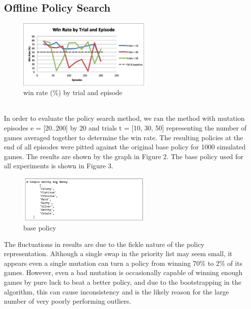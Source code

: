 \documentclass{article}
\begin{document}
\subsection{Offline Policy Search}
\begin{figure}[h]
  \includegraphics[width=250]{search.png}
  \caption{win rate (\%) by trial and episode}
\end{figure}
\\
In order to evaluate the policy search method, we ran the method with mutation episodes e = [20..200] by 20 and trials t = [10, 30, 50] representing the number of games averaged together to determine the win rate. The resulting policies at the end of all episodes were pitted against the original base policy for 1000 simulated games. The results are shown by the graph in Figure 2. The base policy used for all experiments is shown in Figure 3.
\begin{figure}[h]
  \includegraphics[width=250]{policy.png}
  \caption{base policy}
\end{figure}
The fluctuations in results are due to the fickle nature of the policy representation. Although a single swap in the priority list may seem small, it appears even a single mutation can turn a policy from winning 70\% to 2\% of its games. However, even a bad mutation is occasionally capable of winning enough games by pure luck to beat a better policy, and due to the bootstrapping in the algorithm, this can cause inconsistency and is the likely reason for the large number of very poorly performing outliers.
\end{document}

